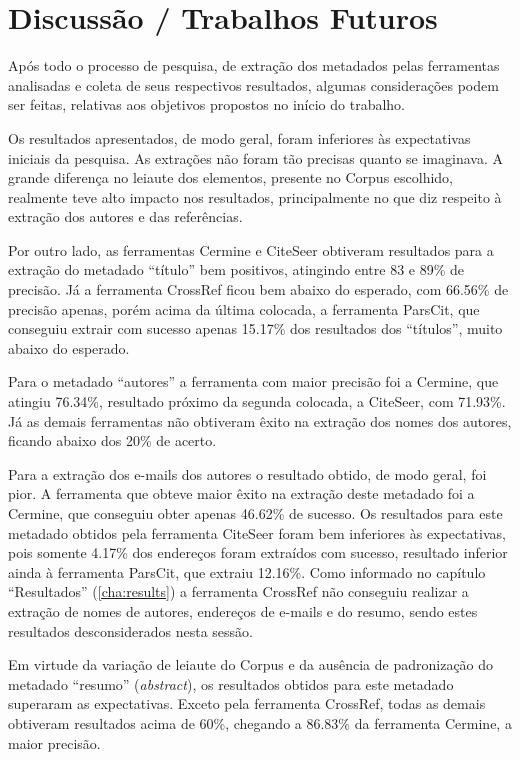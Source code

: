 
\chapter{Discussão / Trabalhos Futuros} %
\label{cha:conclusion}

Após todo o processo de pesquisa, de extração dos metadados pelas ferramentas analisadas e coleta de seus respectivos resultados, algumas considerações podem ser feitas, relativas aos objetivos propostos no início do trabalho.

Os resultados apresentados, de modo geral, foram inferiores às expectativas iniciais da pesquisa. As extrações não foram tão precisas quanto se imaginava. A grande diferença no leiaute dos elementos, presente no Corpus escolhido, realmente teve alto impacto nos resultados, principalmente no que diz respeito à extração dos autores e das referências.

Por outro lado, as ferramentas Cermine e CiteSeer obtiveram resultados para a extração do metadado ``título'' bem positivos, atingindo entre 83 e 89\% de precisão. Já a ferramenta CrossRef ficou bem abaixo do esperado, com 66.56\% de precisão apenas, porém acima da última colocada, a ferramenta ParsCit, que conseguiu extrair com sucesso apenas 15.17\% dos resultados dos ``títulos'', muito abaixo do esperado.

Para o metadado ``autores'' a ferramenta com maior precisão foi a Cermine, que atingiu 76.34\%, resultado próximo da segunda colocada, a CiteSeer, com 71.93\%. Já as demais ferramentas não obtiveram êxito na extração dos nomes dos autores, ficando abaixo dos 20\% de acerto.

Para a extração dos e-mails dos autores o resultado obtido, de modo geral, foi pior. A ferramenta que obteve maior êxito na extração deste metadado foi a Cermine, que conseguiu obter apenas 46.62\% de sucesso. Os resultados para este metadado obtidos pela ferramenta CiteSeer foram bem inferiores às expectativas, pois somente 4.17\% dos endereços foram extraídos com sucesso, resultado inferior ainda à ferramenta ParsCit, que extraiu 12.16\%. Como informado no capítulo ``Resultados'' (\autoref{cha:results}) a ferramenta CrossRef não conseguiu realizar a extração de nomes de autores, endereços de e-mails e do resumo, sendo estes resultados desconsiderados nesta sessão.

Em virtude da variação de leiaute do Corpus e da ausência de padronização do metadado ``resumo'' (\emph{abstract}), os resultados obtidos para este metadado superaram as expectativas. Exceto pela ferramenta CrossRef, todas as demais obtiveram resultados acima de 60\%, chegando a 86.83\% da ferramenta Cermine, a maior precisão. 

